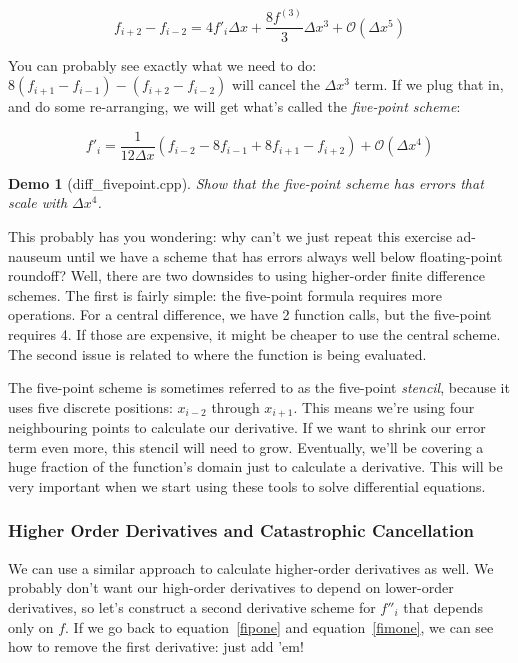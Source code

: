 \documentclass{article}
\theoremstyle{demo}
\newtheorem{demo}{Demo}[section]
\begin{document}
\begin{equation}
    f_{i+2} - f_{i-2} = 4f'_i \Delta x + \frac{8f^{(3)}}{3} \Delta x^3 +
    \mathcal{O}(\Delta x^5)
\end{equation}

You can probably see exactly what we need to do:  $8(f_{i+1}-f_{i-1}) -
(f_{i+2}-f_{i-2})$ will cancel the $\Delta x^3$ term.  If we plug that in, and
do some re-arranging, we will get what's called the \textit{five-point scheme}:

\begin{equation}
    f'_i = \frac{1}{12\Delta x}(f_{i-2} - 8f_{i-1} + 8f_{i+1} - f_{i+2}) +
    \mathcal{O}(\Delta x^4)
\end{equation}

\begin{demo}[diff\_fivepoint.cpp]
    Show that the five-point scheme has errors that scale with $\Delta x^4$.  
\end{demo}

This probably has you wondering: why can't we just repeat this exercise
ad-nauseum until we have a scheme that has errors always well below
floating-point roundoff?  Well, there are two downsides to using higher-order 
finite difference schemes.  The first is fairly simple: the five-point formula
requires more operations.  For a central difference, we have 2 function calls,
but the five-point requires 4.  If those are expensive, it might be cheaper to
use the central scheme.  The second issue is related to where the function is
being evaluated.  

The five-point scheme is sometimes referred to as the five-point
\textit{stencil}, because it uses five discrete positions: $x_{i-2}$ through
$x_{i+1}$.  This means we're using four neighbouring points to calculate our
derivative.  If we want to shrink our error term even more, this stencil will
need to grow.  Eventually, we'll be covering a huge fraction of the function's
domain just to calculate a derivative.  This will be very important when we
start using these tools to solve differential equations.

\subsubsection{Higher Order Derivatives and Catastrophic Cancellation}
We can use a similar approach to calculate higher-order derivatives as well.  We
probably don't want our high-order derivatives to depend on lower-order
derivatives, so let's construct a second derivative scheme for $f''_i$ that
depends only on $f$.  If we go back to equation~\ref{fipone} and
equation~\ref{fimone}, we can see how to remove the first derivative: just add
'em!
\end{document}
